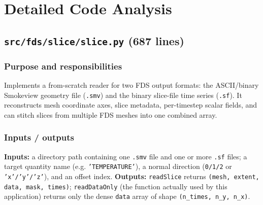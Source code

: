 \documentclass[11pt,a4paper]{report}
\begin{document}
\chapter{Detailed Code Analysis}

\section{\texttt{src/fds/slice/slice.py} (687 lines)}

\subsection{Purpose and responsibilities}
Implements a from-scratch reader for two FDS output formats: the ASCII/binary Smokeview geometry
file (\texttt{.smv}) and the binary slice-file time series (\texttt{.sf}). It reconstructs mesh
coordinate axes, slice metadata, per-timestep scalar fields, and can stitch slices from multiple FDS
meshes into one combined array.

\subsection{Inputs / outputs}
\textbf{Inputs:} a directory path containing one \texttt{.smv} file and one or more \texttt{.sf}
files; a target quantity name (e.g. \texttt{'TEMPERATURE'}), a normal direction (\texttt{0/1/2} or
\texttt{'x'/'y'/'z'}), and an offset index. \textbf{Outputs:} \texttt{readSlice} returns
\texttt{(mesh, extent, data, mask, times)}; \texttt{readDataOnly} (the function actually used by this
application) returns only the dense \texttt{data} array of shape \texttt{(n\_times, n\_y, n\_x)}.
\end{document}
